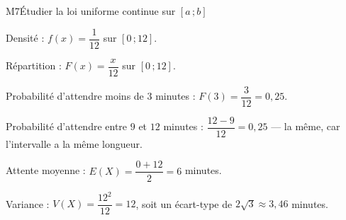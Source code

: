 \begin{fichemethode}{M7}{Étudier la loi uniforme continue sur $[a\,;b]$}
{  \medskip
  Densité : $f(x) = \dfrac{1}{12}$ sur $[0\,;12]$.

  Répartition : $F(x) = \dfrac{x}{12}$ sur $[0\,;12]$.

  Probabilité d'attendre moins de $3$ minutes :
  $F(3) = \dfrac{3}{12} = 0{,}25$.

  Probabilité d'attendre entre $9$ et $12$ minutes :
  $\dfrac{12-9}{12} = 0{,}25$ — la même, car l'intervalle a la même longueur.

  Attente moyenne : $E(X) = \dfrac{0+12}{2} = 6$ minutes.

  Variance : $V(X) = \dfrac{12^2}{12} = 12$, soit un écart-type de
  $2\sqrt{3} \approx 3{,}46$ minutes.
}

%
%
%
%
%


\end{fichemethode}
